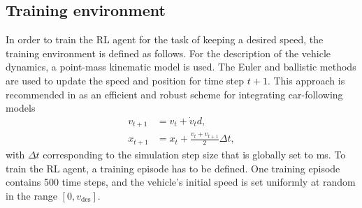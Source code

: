 \documentclass[review]{elsarticle}
\providecommand{\sub}[1]{_{\mathrm{#1}}}  %
\providecommand{\3}{{\ss}}
\begin{document}
	
	\subsection{Training environment}
	\label{training_environment1}
	In order to train the RL agent for the task of keeping a desired
	speed, the training environment is defined as follows. For the description of the vehicle dynamics, a point-mass kinematic model is used. The Euler and ballistic methods are used to update the speed and position for time step $t + 1$. This approach is recommended in \cite{numericalUpdateMethodsTreiber} as an efficient
	and robust scheme for integrating car-following models	
	\begin{align}
		v_{t+1} &= v_{t} + \dot{v}_{t} d, \\
		x_{t+1} &= x_{t} + \frac{v_{t} + v_{t+1}}{2} \Delta t,
	\end{align}
	with $\Delta t$ corresponding to the simulation step size that is globally
	set to \unit[100]{ms}. To train the RL agent, a training episode has to be defined. One training episode contains 500 time steps, and the vehicle's initial speed is set uniformly at random in the range $[0,v\sub{des}]$.
	
\end{document}
